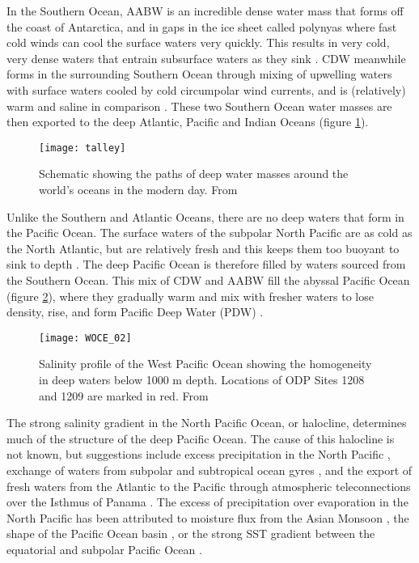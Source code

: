 In the Southern Ocean, AABW is an incredible dense water mass that forms off the coast of Antarctica, and in gaps in the ice sheet called polynyas where fast cold winds can cool the surface waters very quickly. This results in very cold, very dense waters that entrain subsurface waters as they sink \citep{ohshimaGlobalViewSeaice2016}. CDW meanwhile forms in the surrounding Southern Ocean through mixing of upwelling waters with surface waters cooled by cold circumpolar wind currents, and is (relatively) warm and saline in comparison \citep{moffatCharacteristicsCircumpolarDeep2009}. These two Southern Ocean water masses are then exported to the deep Atlantic, Pacific and Indian Oceans (figure \ref{fig:talley}).

\begin{figure}[h]
    \centering
    \texttt{[image: talley]}
    \caption{Schematic showing the paths of deep water masses around the world's oceans in the modern day. From \citet{talleyClosureGlobalOverturning2013}}
    \label{fig:talley}
\end{figure}

Unlike the Southern and Atlantic Oceans, there are no deep waters that form in the Pacific Ocean. The surface waters of the subpolar North Pacific are as cold as the North Atlantic, but are relatively fresh and this keeps them too buoyant to sink to depth \citep{warrenWhyNoDeep1983}. The deep Pacific Ocean is therefore filled by waters sourced from the Southern Ocean. This mix of CDW and AABW fill the abyssal Pacific Ocean (figure \ref{fig:WOCE_02}), where they gradually warm and mix with fresher waters to lose density, rise, and form Pacific Deep Water (PDW) \citep{talleyClosureGlobalOverturning2013}.

\begin{figure}[h]
    \centering
    \texttt{[image: WOCE\_02]}
    \caption{Salinity profile of the West Pacific Ocean showing the homogeneity in deep waters below 1000 m depth. Locations of ODP Sites 1208 and 1209 are marked in red. From \citet{schlitzerElectronicAtlasWOCE2000}}
    \label{fig:WOCE_02}
\end{figure}

The strong salinity gradient in the North Pacific Ocean, or halocline, determines much of the structure of the deep Pacific Ocean. The cause of this halocline is not known, but suggestions include excess precipitation in the North Pacific \citep{stockerRapidTransitionsOcean1991}, exchange of waters from subpolar and subtropical ocean gyres \citep{emile-geayWarrenRevisitedAtmospheric2003}, and the export of fresh waters from the Atlantic to the Pacific through atmospheric teleconnections over the Isthmus of Panama \citep{richterMoistureTransportAtlantic2010}. The excess of precipitation over evaporation in the North Pacific has been attributed to moisture flux from the Asian Monsoon \citep{emile-geayWarrenRevisitedAtmospheric2003}, the shape of the Pacific Ocean basin \citep{ferreiraAtlanticPacificAsymmetryDeep2018}, or the strong SST gradient between the equatorial and subpolar Pacific Ocean \citep{burlsActivePacificMeridional2017}.



